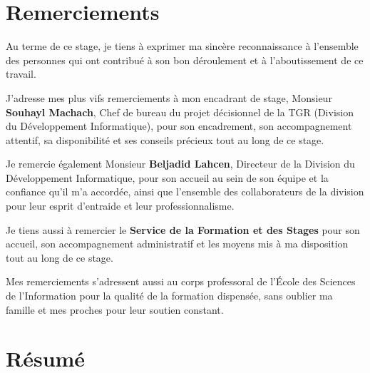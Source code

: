 \documentclass[a4paper,12pt,oneside]{report}
\begin{document}

\chapter*{Remerciements}

Au terme de ce stage, je tiens à exprimer ma sincère reconnaissance à
l'ensemble des personnes qui ont contribué à son bon déroulement et à
l'aboutissement de ce travail.

\medskip
J'adresse mes plus vifs remerciements à mon encadrant de stage, Monsieur
\textbf{Souhayl Machach}, Chef de bureau du projet décisionnel de la TGR
(Division du Développement Informatique), pour son encadrement, son
accompagnement attentif, sa disponibilité et ses conseils précieux tout au long
de ce stage.

\medskip
Je remercie également Monsieur \textbf{Beljadid Lahcen}, Directeur de la Division
du Développement Informatique, pour son accueil au sein de son équipe et la
confiance qu'il m'a accordée, ainsi que l'ensemble des collaborateurs de la
division pour leur esprit d'entraide et leur professionnalisme.

\medskip
Je tiens aussi à remercier le \textbf{Service de la Formation et des Stages}
pour son accueil, son accompagnement administratif et les moyens mis à ma
disposition tout au long de ce stage.

\medskip
Mes remerciements s'adressent aussi au corps professoral de l'École des Sciences
de l'Information pour la qualité de la formation dispensée, sans oublier ma
famille et mes proches pour leur soutien constant.

\chapter*{Résumé}
\end{document}

